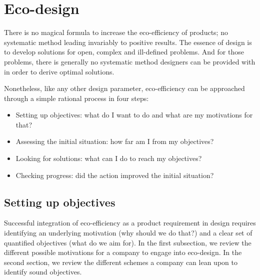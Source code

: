 \documentclass{article}
\begin{document}
\section{Eco-design}
\label{sec:ecodesign}

There is no magical formula to increase the eco-efficiency of products; no systematic method leading invariably to positive results. The essence of design is to develop solutions for open, complex and ill-defined problems. And for those problems, there is generally no systematic method designers can be provided with in order to derive optimal solutions. 

Nonetheless, like any other design parameter, eco-efficiency can be approached through a simple rational process in four steps:
\begin{itemize}
	\item Setting up objectives: what do I want to do and what are my motivations for that?
	\item Assessing the initial situation: how far am I from my objectives?
	\item Looking for solutions: what can I do to reach my objectives?
	\item Checking progress: did the action improved the initial situation?
\end{itemize}

\subsection{Setting up objectives}
\label{sec:objectives}

Successful integration of eco-efficiency as a product requirement in design requires identifying an underlying motivation (why should we do that?) and a clear set of quantified objectives (what do we aim for). In the first subsection, we review the different possible motivations for a company to engage into eco-design. In the second section, we review the different schemes a company can lean upon to identify sound objectives.
\end{document}
